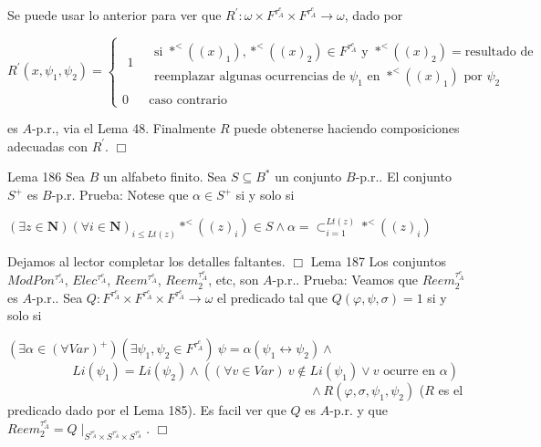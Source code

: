 Se puede usar lo anterior para ver que \(R^{\prime }:\omega \times F^{\tau _{A}^{e}}\times F^{\tau _{A}^{e}}\rightarrow \omega \), dado por

\(\displaystyle R^{\prime }(x,\psi _{1},\psi _{2})=\left\{ \begin{array}{cc} \begin{array}{c} 1 \\ \; \end{array} & \begin{array}{c} \text{si }\ast ^{< }((x)_{1}),\ast ^{< }((x)_{2})\in F^{\tau _{A}^{e}}\text{ y }\ast ^{< }((x)_{2})=\text{resultado de} \\ \text{reemplazar algunas ocurrencias de }\psi _{1}\text{ en }\ast ^{< }((x)_{1})\text{ por }\psi _{2} \end{array} \\ 0 & \text{caso contrario} \end{array} \right. \)

es \(A\)-p.r., via el Lema 48. Finalmente \(R\) puede obtenerse haciendo composiciones adecuadas con \(R^{\prime }\). \(\Box\)

Lema 186 Sea \(B\) un alfabeto finito. Sea \(S\subseteq B^{\ast }\) un conjunto \(B\)-p.r.. El conjunto \(S^{+}\) es \(B\)-p.r.
Prueba: Notese que \(\alpha \in S^{+}\) si y solo si

\(\displaystyle (\exists z\in \mathbf{N})(\forall i\in \mathbf{N})_{i\leq Lt(z)}\ast ^{< }((z)_{i})\in S\wedge \alpha =\mathrm{\subset }_{i=1}^{Lt(z)}\ast ^{< }((z)_{i}) \)

Dejamos al lector completar los detalles faltantes. \(\Box\)
Lema 187 Los conjuntos \(ModPon^{\tau _{A}^{e}}\), \(Elec^{\tau _{A}^{e}}\), \(Reem^{\tau _{A}^{e}}\), \(Reem_{2}^{\tau _{A}^{e}}\), etc, son \(A\)-p.r..
Prueba: Veamos que \(Reem_{2}^{\tau _{A}^{e}}\) es \(A\)-p.r.. Sea \(Q:F^{\tau _{A}^{e}}\times F^{\tau _{A}^{e}}\times F^{\tau _{A}^{e}}\rightarrow \omega \) el predicado tal que \(Q(\varphi ,\psi ,\sigma )=1\) si y solo si

\((\exists \alpha \in (\forall Var)^{+})(\exists \psi _{1},\psi _{2}\in F^{\tau _{A}^{e}})\ \psi =\alpha (\psi _{1}\leftrightarrow \psi _{2})\wedge \)
\(\ \ \ \ \ \ \ \ \ \ \ \ \ \ \ \ \ \ \ \ \ \ \ Li(\psi _{1})=Li(\psi _{2})\wedge \left( (\forall v\in Var)\ v\notin Li(\psi _{1})\vee v\text{ ocurre en }\alpha \right) \)
\(\ \ \ \ \ \ \ \ \ \ \ \ \ \ \ \ \ \ \ \ \ \ \ \ \ \ \ \ \ \ \ \ \ \ \ \ \ \ \ \ \ \ \ \ \ \ \ \ \ \ \ \ \ \ \ \ \ \ \ \ \ \ \ \ \ \ \ \ \ \ \ \ \ \ \ \ \ \ \ \ \ \ \ \ \ \ \ \ \ \ \ \ \ \ \ \ \ \ \ \ \ \ \ \ \ \ \ \wedge R(\varphi ,\sigma ,\psi _{1},\psi _{2})\)
(\(R\) es el predicado dado por el Lema 185). Es facil ver que \(Q\) es \(A\)-p.r. y que \(Reem_{2}^{\tau _{A}^{e}}=Q\mid _{S^{\tau _{A}^{e}}\times S^{\tau _{A}^{e}}\times S^{\tau _{A}^{e}}}\). \(\Box\)

